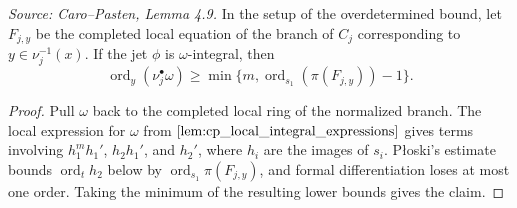 \begin{lemma}
  \label{lem:cp_individual_branch_bound}
  \textit{Source: Caro--Pasten, Lemma 4.9.}
  In the setup of the overdetermined bound, let \(F_{j,y}\) be the completed
  local equation of the branch of \(C_j\) corresponding to
  \(y\in\nu_j^{-1}(x)\).  If the jet \(\phi\) is \(\omega\)-integral, then
  \[
    \operatorname{ord}_y(\nu_j^\bullet\omega)
    \ge \min\{m,\operatorname{ord}_{s_1}(\pi(F_{j,y}))-1\}.
  \]
\end{lemma}
\begin{proof}
  Pull \(\omega\) back to the completed local ring of the normalized branch.
  The local expression for \(\omega\) from
  \(\ref{lem:cp_local_integral_expressions}\) gives terms involving
  \(h_1^m h_1'\), \(h_2h_1'\), and \(h_2'\), where
  \(h_i\) are the images of \(s_i\).  Płoski's estimate bounds
  \(\operatorname{ord}_t h_2\) below by
  \(\operatorname{ord}_{s_1}\pi(F_{j,y})\), and formal differentiation loses
  at most one order.  Taking the minimum of the resulting lower bounds gives
  the claim.
\end{proof}


